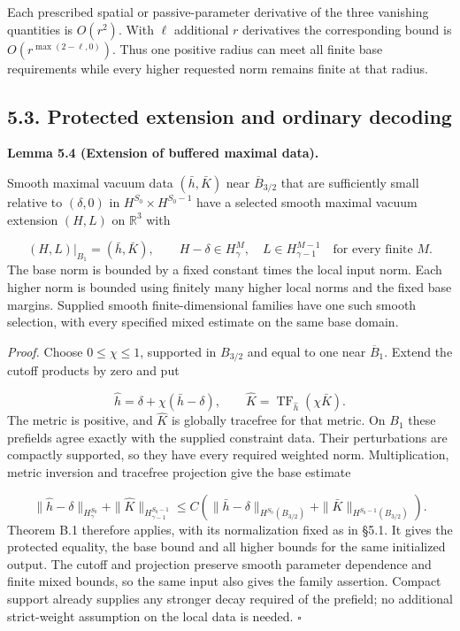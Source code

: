 \documentclass[
  english,
  11pt,
  reqno]{amsart}
\makeatletter
\newcommand{\pandocstatementheading}[1]{%
  \par\addpenalty{\@beginparpenalty}%
  \addvspace{.5\baselineskip plus .2\baselineskip minus .2\baselineskip}%
  {\normalfont\bfseries #1\par}%
  \nobreak\@afterindenttrue\@afterheading
}
\makeatother
\begin{document}
Each prescribed spatial or passive-parameter derivative of the three
vanishing quantities is \(O(r^2)\). With \(\ell\) additional \(r\)
derivatives the corresponding bound is \(O(r^{\max(2-\ell,0)})\). Thus
one positive radius can meet all finite base requirements while every
higher requested norm remains finite at that radius.

\newpage
\subsection{5.3. Protected extension and ordinary
decoding}\label{protected-extension-and-ordinary-decoding}\label{sec:submission-protected-extension}

\pandocstatementheading{\leavevmode{}\label{lem:submission-buffered-maximal-extension}Lemma 5.4 (Extension of buffered maximal data).}

Smooth maximal vacuum data \((\bar h,\bar K)\) near
\(\overline B_{3/2}\) that are sufficiently small relative to
\((\delta,0)\) in \(H^{S_0}\times H^{S_0-1}\) have a selected smooth
maximal vacuum extension \((H,L)\) on \(\mathbb R^3\) with

\label{eq:submission-buffered-extension} \[
(H,L)|_{B_1}=(\bar h,\bar K),
\qquad
H-\delta\in H^M_\gamma,
\quad
L\in H^{M-1}_{\gamma-1}
\quad\text{for every finite }M.
\] The base norm is bounded by a fixed constant times the local input
norm. Each higher norm is bounded using finitely many higher local norms
and the fixed base margins. Supplied smooth finite-dimensional families
have one such smooth selection, with every specified mixed estimate on
the same base domain.

\emph{Proof.} Choose \(0\le\chi\le1\), supported in \(B_{3/2}\) and
equal to one near \(\overline B_1\). Extend the cutoff products by zero
and put

\label{eq:submission-cutoff-prefields} \[
\widehat h=\delta+\chi(\bar h-\delta),
\qquad
\widehat K=\operatorname{TF}_{\widehat h}(\chi\bar K).
\] The metric is positive, and \(\widehat K\) is globally tracefree for
that metric. On \(B_1\) these prefields agree exactly with the supplied
constraint data. Their perturbations are compactly supported, so they
have every required weighted norm. Multiplication, metric inversion and
tracefree projection give the base estimate

\label{eq:submission-cutoff-base-estimate} \[
\|\widehat h-\delta\|_{H^{S_0}_\gamma}
+\|\widehat K\|_{H^{S_0-1}_{\gamma-1}}
\le
C\left(
\|\bar h-\delta\|_{H^{S_0}(B_{3/2})}
+\|\bar K\|_{H^{S_0-1}(B_{3/2})}
\right).
\] Theorem B.1 therefore applies, with its normalization fixed as in
§5.1. It gives the protected equality, the base bound and all higher
bounds for the same initialized output. The cutoff and projection
preserve smooth parameter dependence and finite mixed bounds, so the
same input also gives the family assertion. Compact support already
supplies any stronger decay required of the prefield; no additional
strict-weight assumption on the local data is needed. \hfill\(\square\)
\end{document}
